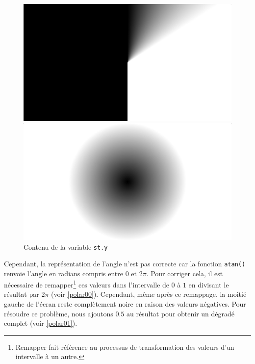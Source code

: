 \begin{figure}[h]
  \begin{minipage}[b]{0.45\linewidth}
    \centering
    \includegraphics[width=\linewidth]{images/polarX.JPG}
    \caption{Contenu de la variable \lstinline{st.x}}
    \label{polarX}
  \end{minipage}
  \hspace{0.1\linewidth} %
  \begin{minipage}[b]{0.45\linewidth}
    \centering
    \includegraphics[width=\linewidth]{images/polarY.JPG}
    \caption{Contenu de la variable \lstinline{st.y}}
    \label{polarY}
  \end{minipage}
\end{figure}


Cependant, la représentation de l'angle n'est pas correcte car la fonction \lstinline{atan()} renvoie l'angle en radians compris entre $0$ et $2\pi$. Pour corriger cela, il est nécessaire de remapper\footnote{Remapper fait référence au processus de transformation des valeurs d'un intervalle à un autre.} ces valeurs dans l'intervalle de $0$ à $1$ en divisant le résultat par $2\pi$ (voir \ref{polar00}). Cependant, même après ce remappage, la moitié gauche de l'écran reste complètement noire en raison des valeurs négatives. Pour résoudre ce problème, nous ajoutons $0.5$ au résultat pour obtenir un dégradé complet (voir \ref{polar01}).

